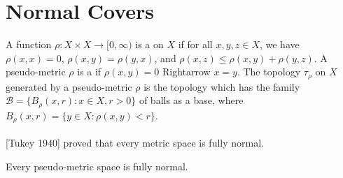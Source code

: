 \documentclass[main.tex]{subfiles}
\begin{document}
	

\section{Normal Covers}\label{sec:2.1}

{ \label{def:2.1.1}
A function $\rho: X \times X \to [0, \infty)$ is a 
 on $X$ if for all $x, y, z \in X$, we have $\rho(x, x) = 0$, $\rho(x, y) = \rho(y, x)$, 
 and $\rho(x, z) \le \rho(x, y) + \rho(y, z)$. A pseudo-metric $\rho$ is a 
 if $\rho(x, y) = 0$ Rightarrow $x = y$. 
 The topology $\tau_\rho$ on $X$ generated by a pseudo-metric $\rho$ is 
 the topology which has the family $\mathscr{B} = \{B_\rho(x, r): x \in X, r > 0\}$ 
 of balls as a base, where $B_\rho(x, r) = \{y \in X: \rho(x, y) < r\}$.
}

\vspace{8pt}
[Tukey 1940]\textsuperscript{\cite{Tukey}} proved that every metric space is fully normal.

{\theorem{}\label{th:2.1.2} Every pseudo-metric space is fully normal.
}
\end{document}
